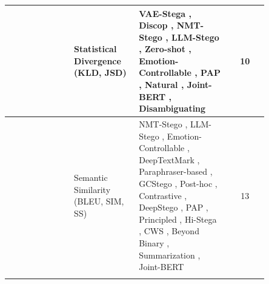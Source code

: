 \begin{table}[ht]
\begin{tabular}{|>{\raggedright\arraybackslash}p{0.25\linewidth}|>{\raggedright\arraybackslash}p{0.25\linewidth}|>{\raggedright\arraybackslash}p{0.35\linewidth}|c|}
    \cline{2-4}
                                & Statistical Divergence (KLD, JSD)   & VAE-Stega \cite{yang2020vae}, Discop \cite{ding2023discop}, NMT-Stego \cite{ding2023context}, LLM-Stego \cite{wu2024generative}, Zero-shot \cite{lin2024zero}, Emotion-Controllable \cite{shi2025emotionally}, PAP \cite{lin2025positionagnostic}, Natural \cite{steinebach2024natural}, Joint-BERT \cite{ding2023joint}, Disambiguating \cite{qi2024provably}                                                                                                                                                                                                                                                                                                                                                                                                                                                                                                                                                                                                                                   & 10                   \\
    \cline{2-4}
                                & Semantic Similarity (BLEU, SIM, SS) & NMT-Stego \cite{ding2023context}, LLM-Stego \cite{wu2024generative}, Emotion-Controllable \cite{shi2025emotionally}, DeepTextMark \cite{munyer2024deeptextmark}, Paraphraser-based \cite{qiang2023natural}, GCStego \cite{liao2024co}, Post-hoc \cite{hao2025robust}, Contrastive \cite{wang2025contrastive}, DeepStego \cite{kuznetsov2025deepstego}, PAP \cite{lin2025positionagnostic}, Principled \cite{ji2024principled}, Hi-Stega \cite{wang2023hi}, CWS \cite{li2024imperceptible}, Beyond Binary \cite{xu2024beyond}, Summarization \cite{zhang2024controllable}, Joint-BERT \cite{ding2023joint}                                                                                                                                                                                                                                                                                                                                                                                        & 13                   \\
    \cline{2-4}

\end{tabular}
\end{table}
